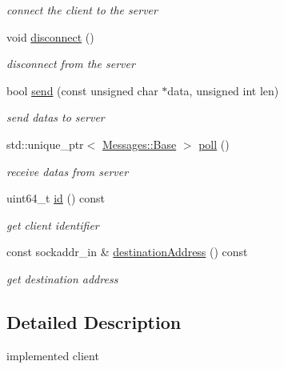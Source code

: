 \begin{DoxyCompactItemize}
\begin{DoxyCompactList}\small\item\em connect the client to the server \end{DoxyCompactList}\item 
\mbox{\label{class_network_1_1_t_c_p_1_1_client_impl_a4ea190e2b029095330f6bead31921767}} 
void \hyperlink{class_network_1_1_t_c_p_1_1_client_impl_a4ea190e2b029095330f6bead31921767}{disconnect} ()
\begin{DoxyCompactList}\small\item\em disconnect from the server \end{DoxyCompactList}\item 
bool \hyperlink{class_network_1_1_t_c_p_1_1_client_impl_aba6d19f77b5b9550acb5b3a37862d584}{send} (const unsigned char $\ast$data, unsigned int len)
\begin{DoxyCompactList}\small\item\em send datas to server \end{DoxyCompactList}\item 
std\+::unique\+\_\+ptr$<$ \hyperlink{class_network_1_1_messages_1_1_base}{Messages\+::\+Base} $>$ \hyperlink{class_network_1_1_t_c_p_1_1_client_impl_a648c471983de01e2a86a280ff73dee7d}{poll} ()
\begin{DoxyCompactList}\small\item\em receive datas from server \end{DoxyCompactList}\item 
uint64\+\_\+t \hyperlink{class_network_1_1_t_c_p_1_1_client_impl_acde19485b353bd1224cd8ea9a209d797}{id} () const
\begin{DoxyCompactList}\small\item\em get client identifier \end{DoxyCompactList}\item 
const sockaddr\+\_\+in \& \hyperlink{class_network_1_1_t_c_p_1_1_client_impl_a6b6bf0a8ab15b738f90d1f636d514b14}{destination\+Address} () const
\begin{DoxyCompactList}\small\item\em get destination address \end{DoxyCompactList}\end{DoxyCompactItemize}


\subsection{Detailed Description}
implemented client 

